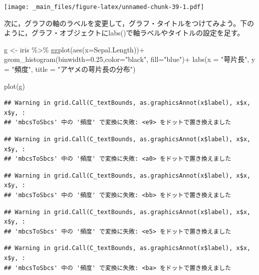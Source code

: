 \documentclass[
]{book}
\newenvironment{Shaded}{\begin{snugshade}}{\end{snugshade}}
\newcommand{\AttributeTok}[1]{\textcolor[rgb]{0.77,0.63,0.00}{#1}}
\newcommand{\FloatTok}[1]{\textcolor[rgb]{0.00,0.00,0.81}{#1}}
\newcommand{\FunctionTok}[1]{\textcolor[rgb]{0.00,0.00,0.00}{#1}}
\newcommand{\NormalTok}[1]{#1}
\newcommand{\OtherTok}[1]{\textcolor[rgb]{0.56,0.35,0.01}{#1}}
\newcommand{\SpecialCharTok}[1]{\textcolor[rgb]{0.00,0.00,0.00}{#1}}
\newcommand{\StringTok}[1]{\textcolor[rgb]{0.31,0.60,0.02}{#1}}
\begin{document}
\texttt{[image: \_main\_files/figure-latex/unnamed-chunk-39-1.pdf]}

次に，グラフの軸のラベルを変更して，グラフ・タイトルをつけてみよう。下のように，グラフ・オブジェクトにlabs()で軸ラベルやタイトルの設定を足す。

\begin{Shaded}
\begin{Highlighting}[]
\NormalTok{g }\OtherTok{\textless{}{-}}\NormalTok{ iris }\SpecialCharTok{\%\textgreater{}\%} 
  \FunctionTok{ggplot}\NormalTok{(}\FunctionTok{aes}\NormalTok{(}\AttributeTok{x=}\NormalTok{Sepal.Length))}\SpecialCharTok{+}
  \FunctionTok{geom\_histogram}\NormalTok{(}\AttributeTok{binwidth=}\FloatTok{0.25}\NormalTok{,}\AttributeTok{color=}\StringTok{"black"}\NormalTok{, }\AttributeTok{fill=}\StringTok{"blue"}\NormalTok{)}\SpecialCharTok{+}
  \FunctionTok{labs}\NormalTok{(}\AttributeTok{x =} \StringTok{"萼片長"}\NormalTok{, }\AttributeTok{y =} \StringTok{"頻度"}\NormalTok{, }\AttributeTok{title =} \StringTok{"アヤメの萼片長の分布"}\NormalTok{)}

\FunctionTok{plot}\NormalTok{(g)}
\end{Highlighting}
\end{Shaded}

\begin{verbatim}
## Warning in grid.Call(C_textBounds, as.graphicsAnnot(x$label), x$x, x$y, :
## 'mbcsToSbcs' 中の '頻度' で変換に失敗: <e9> をドットで置き換えました
\end{verbatim}

\begin{verbatim}
## Warning in grid.Call(C_textBounds, as.graphicsAnnot(x$label), x$x, x$y, :
## 'mbcsToSbcs' 中の '頻度' で変換に失敗: <a0> をドットで置き換えました
\end{verbatim}

\begin{verbatim}
## Warning in grid.Call(C_textBounds, as.graphicsAnnot(x$label), x$x, x$y, :
## 'mbcsToSbcs' 中の '頻度' で変換に失敗: <bb> をドットで置き換えました
\end{verbatim}

\begin{verbatim}
## Warning in grid.Call(C_textBounds, as.graphicsAnnot(x$label), x$x, x$y, :
## 'mbcsToSbcs' 中の '頻度' で変換に失敗: <e5> をドットで置き換えました
\end{verbatim}

\begin{verbatim}
## Warning in grid.Call(C_textBounds, as.graphicsAnnot(x$label), x$x, x$y, :
## 'mbcsToSbcs' 中の '頻度' で変換に失敗: <ba> をドットで置き換えました
\end{verbatim}
\end{document}
